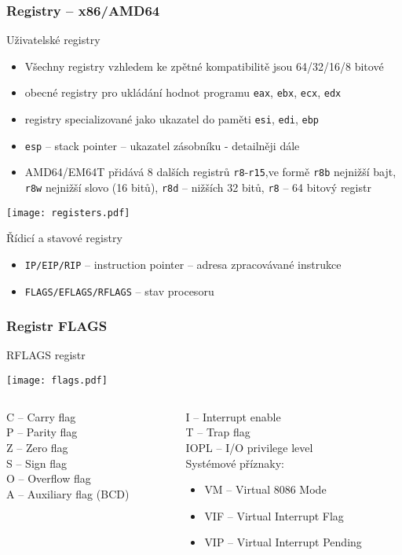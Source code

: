 \documentclass{beamer}
\begin{document}
\begin{frame}[shrink=1.2]
\frametitle{Registry -- x86/AMD64}
\small
Uživatelské registry
\begin{itemize}
\item Všechny registry vzhledem ke zpětné kompatibilitě jsou 64/32/16/8 bitové
\item obecné registry pro ukládání hodnot programu \texttt{eax}, \texttt{ebx}, \texttt{ecx}, \texttt{edx}
\item registry specializované jako ukazatel do paměti \texttt{esi}, \texttt{edi}, \texttt{ebp}
\item \texttt{esp} – stack pointer -- ukazatel zásobníku - detailněji dále
\item AMD64/EM64T přidává 8 dalších registrů \texttt{r8}-\texttt{r15},ve formě \texttt{r8b} nejnižší bajt, \texttt{r8w} nejnižší slovo (16 bitů), \texttt{r8d} – nižších 32 bitů, \texttt{r8} – 64 bitový registr
\end{itemize}
\begin{center}
\texttt{[image: registers.pdf]}
\end{center}
Řídicí a stavové registry
\begin{itemize}
\item \texttt{IP/EIP/RIP} – instruction pointer – adresa zpracovávané instrukce
\item \texttt{FLAGS/EFLAGS/RFLAGS} – stav procesoru
\end{itemize}

\end{frame}



\begin{frame}
\frametitle{Registr FLAGS}
RFLAGS registr
\begin{center}
\texttt{[image: flags.pdf]}
\end{center}
\begin{columns}[t,onlytextwidth]
\begin{column}{0.5\textwidth}
C -- Carry flag\\
P -- Parity flag\\
Z -- Zero flag\\
S -- Sign flag\\
O -- Overflow flag\\
A -- Auxiliary flag (BCD)
\end{column}
\begin{column}{0.5\textwidth}  
I -- Interrupt enable\\
T -- Trap flag\\
IOPL -- I/O privilege level\\
Systémové příznaky:
\begin{itemize}
\item VM -- Virtual 8086 Mode
\item VIF -- Virtual Interrupt Flag
\item VIP -- Virtual Interrupt Pending
\end{itemize}
\end{column}
\end{columns}
\end{frame}
\end{document}
